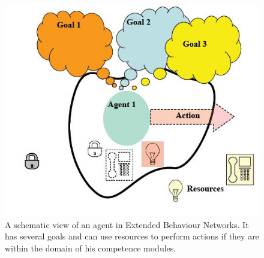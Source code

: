 \documentclass[
		twoside,openright,titlepage,numbers=noenddot,manychapters,
		headinclude,%
                footinclude=false,cleardoublepage=empty,
                BCOR=5mm,
		fontsize=11pt, %
                 enabledeprecatedfontcommands]{scrreprt}
\begin{document}
\begin{figure}[]

\begin{center}
\includegraphics[scale=0.3]{figures/EBN1.jpg}
\caption{A schematic view of an agent in Extended Behaviour Networks. It has several goals and can use resources to perform actions if they are within the domain of his competence modules.}
\label{fig_EBN1}
\end{center}

\end{figure}
\end{document}
